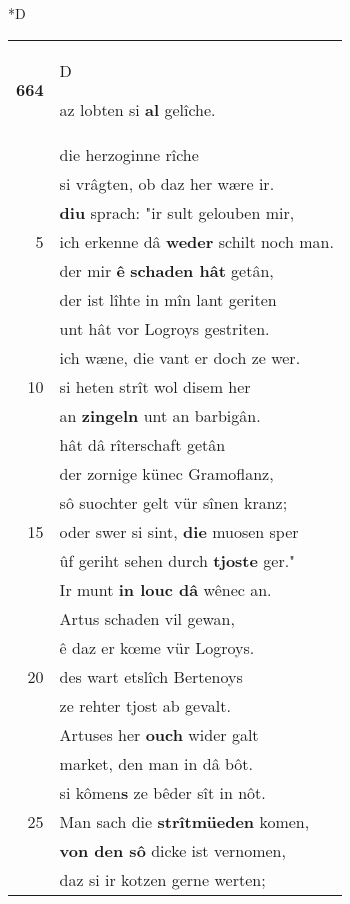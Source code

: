 \documentclass[8pt,a4paper,notitlepage]{article}
\begin{document}
\begin{table}[ht]
\begin{minipage}[t]{0.5\linewidth}
\small
\begin{center}*D
\end{center}
\begin{tabular}{rl}
\textbf{664} & \begin{large}D\end{large}az lobten si \textbf{al} gelîche.\\ 
 & die herzoginne rîche\\ 
 & si vrâgten, ob daz her wære ir.\\ 
 & \textbf{diu} sprach: "ir sult gelouben mir,\\ 
5 & ich erkenne dâ \textbf{weder} schilt noch man.\\ 
 & der mir \textbf{ê} \textbf{schaden hât} getân,\\ 
 & der ist lîhte in mîn lant geriten\\ 
 & unt hât vor Logroys gestriten.\\ 
 & ich wæne, die vant er doch ze wer.\\ 
10 & si heten strît wol disem her\\ 
 & an \textbf{zingeln} unt an barbigân.\\ 
 & hât dâ rîterschaft getân\\ 
 & der zornige künec Gramoflanz,\\ 
 & sô suochter gelt vür sînen kranz;\\ 
15 & oder swer si sint, \textbf{die} muosen sper\\ 
 & ûf geriht sehen durch \textbf{tjoste} ger."\\ 
 & Ir munt \textbf{in louc dâ} wênec an.\\ 
 & Artus schaden vil gewan,\\ 
 & ê daz er kœme vür Logroys.\\ 
20 & des wart etslîch Bertenoys\\ 
 & ze rehter tjost ab gevalt.\\ 
 & Artuses her \textbf{ouch} wider galt\\ 
 & market, den man in dâ bôt.\\ 
 & si kômen\textbf{s} ze bêder sît in nôt.\\ 
25 & Man sach die \textbf{strîtmüeden} komen,\\ 
 & \textbf{von den sô} dicke ist vernomen,\\ 
 & daz si ir kotzen gerne werten;\\ 

\end{tabular}
\end{minipage}
\end{table}
\end{document}
